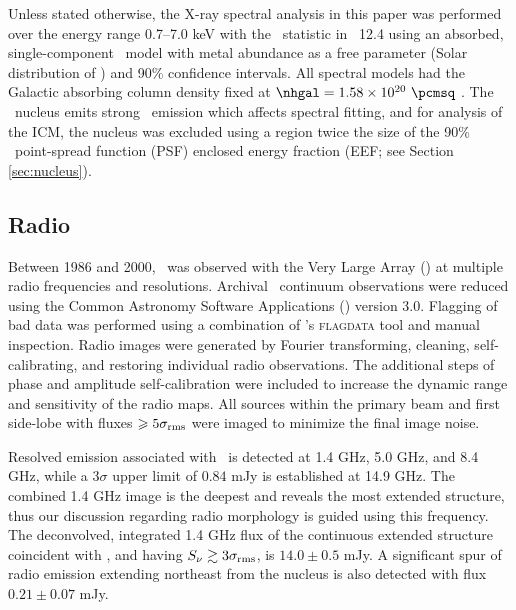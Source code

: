 \documentclass[useAMS,usenatbib]{mn2e}
\begin{document}
Unless stated otherwise, the X-ray spectral analysis in this paper was
performed over the energy range 0.7--7.0 keV with the
\chisq\ statistic in \xspec\ 12.4 \citep{xspec} using an absorbed,
single-component \mekal\ model \citep{mekal1} with metal abundance as
a free parameter (Solar distribution of \citealt{ag89}) and 90\%
confidence intervals. All spectral models had the Galactic absorbing
column density fixed at $\nhgal = 1.58 \times 10^{20} ~\pcmsq$
\citep{lab}. The \irs\ nucleus emits strong \feka\ emission which
affects spectral fitting, and for analysis of the ICM, the nucleus was
excluded using a region twice the size of the 90\% \cxo\ point-spread
function (PSF) enclosed energy fraction (EEF; see Section
\ref{sec:nucleus}).

\subsection{Radio}
\label{sec:radio}

Between 1986 and 2000, \irs\ was observed with the Very Large Array
(\vla) at multiple radio frequencies and resolutions. Archival
\vla\ continuum observations were reduced using the Common Astronomy
Software Applications (\casa) version 3.0. Flagging of bad data was
performed using a combination of \casa's {\textsc{flagdata}} tool and
manual inspection. Radio images were generated by Fourier
transforming, cleaning, self-calibrating, and restoring individual
radio observations. The additional steps of phase and amplitude
self-calibration were included to increase the dynamic range and
sensitivity of the radio maps. All sources within the primary beam and
first side-lobe with fluxes $\ge 5\sigma_{\rm{rms}}$ were imaged to
minimize the final image noise.

Resolved emission associated with \irs\ is detected at 1.4 GHz, 5.0
GHz, and 8.4 GHz, while a $3\sigma$ upper limit of $0.84$ mJy is
established at 14.9 GHz. The combined 1.4 GHz image is the deepest and
reveals the most extended structure, thus our discussion regarding
radio morphology is guided using this frequency. The deconvolved,
integrated 1.4 GHz flux of the continuous extended structure
coincident with \irs, and having $S_{\nu} \ga 3\sigma_{\rm{rms}}$, is
$14.0 \pm 0.5$ mJy. A significant spur of radio emission extending
northeast from the nucleus is also detected with flux $0.21 \pm 0.07$
mJy.
\end{document}
